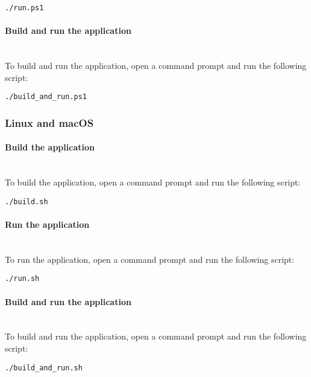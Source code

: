 \begin{lstlisting}[numbers=none]
./run.ps1
\end{lstlisting}

\paragraph{Build and run the application}
\mbox{}\\
To build and run the application, open a command prompt and run the following script:

\begin{lstlisting}[numbers=none]
./build_and_run.ps1
\end{lstlisting}

\subsubsection{Linux and macOS}

\paragraph{Build the application}
\mbox{}\\
To build the application, open a command prompt and run the following script:

\begin{lstlisting}[numbers=none]
./build.sh
\end{lstlisting}

\paragraph{Run the application}
\mbox{}\\
To run the application, open a command prompt and run the following script:

\begin{lstlisting}[numbers=none]
./run.sh
\end{lstlisting}

\paragraph{Build and run the application}
\mbox{}\\
To build and run the application, open a command prompt and run the following script:

\begin{lstlisting}[numbers=none]
./build_and_run.sh
\end{lstlisting}


